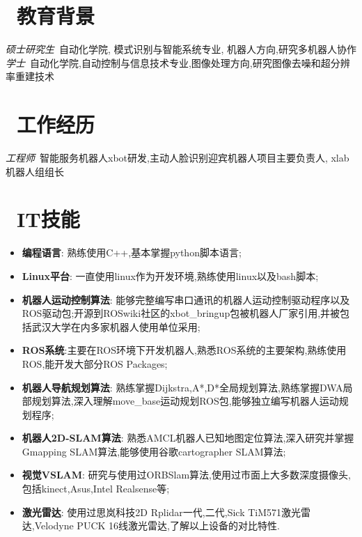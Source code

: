 \documentclass{resume}
\begin{document}




\section{\faGraduationCap\  教育背景}
\textit{硕士研究生}\     自动化学院, 模式识别与智能系统专业, 机器人方向,研究多机器人协作
\textit{学士}\   自动化学院,自动控制与信息技术专业,图像处理方向,研究图像去噪和超分辨率重建技术

\section{\faBriefcase\  工作经历}
\datedsubsection{\textbf{中国科学院软件研究所}}{2016.4 至今}
\textit{工程师}\ 智能服务机器人xbot研发,主动人脸识别迎宾机器人项目主要负责人, xlab机器人组组长

\section{\faCogs\  IT技能}
\begin{itemize}[parsep=0.5ex]
  \item \textbf{编程语言}: 熟练使用C++,基本掌握python脚本语言;
  \item \textbf{Linux平台}: 一直使用linux作为开发环境,熟练使用linux以及bash脚本;
  \item \textbf{机器人运动控制算法}: 能够完整编写串口通讯的机器人运动控制驱动程序以及ROS驱动包;开源到ROSwiki社区的xbot\_bringup包被机器人厂家引用,并被包括武汉大学在内多家机器人使用单位采用;
  \item \textbf{ROS系统}:主要在ROS环境下开发机器人,熟悉ROS系统的主要架构,熟练使用ROS,能开发大部分ROS Packages;
  \item \textbf{机器人导航规划算法}: 熟练掌握Dijkstra,A*,D*全局规划算法,熟练掌握DWA局部规划算法,深入理解move\_base运动规划ROS包,能够独立编写机器人运动规划程序;
  \item \textbf{机器人2D-SLAM算法}: 熟悉AMCL机器人已知地图定位算法,深入研究并掌握Gmapping SLAM算法,能够使用谷歌cartographer SLAM算法;
  \item \textbf{视觉VSLAM}: 研究与使用过ORBSlam算法,使用过市面上大多数深度摄像头,包括kinect,Asus,Intel Realsense等;
  \item \textbf{激光雷达}: 使用过思岚科技2D Rplidar一代,二代,Sick TiM571激光雷达,Velodyne PUCK 16线激光雷达,了解以上设备的对比特性.
\end{itemize}
\end{document}
